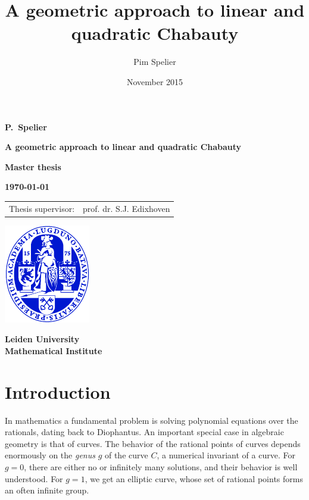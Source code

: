 \documentclass[12pt]{article}
\title{A geometric approach to linear and quadratic Chabauty}
\author{Pim Spelier}
\date{November 2015}
\theoremstyle{plain}
\theoremstyle{definition}
\theoremstyle{remark}
\begin{document}

\vspace*{1em}

\begin{center}

{\Large\bf 
P.\ Spelier
} 

\vspace{1em} 

{\LARGE\bf 
A geometric approach to linear and quadratic Chabauty
} 

\vspace{10em} 

{\large\bf 
Master thesis
} 

\vspace{1em}

{\large\bf 
\today
}

\vspace{10em} 

{\large\bf
\begin{tabular}{ll}
Thesis supervisor: & prof. dr. S.J. Edixhoven\\
\end{tabular}
}

\vfill

\includegraphics{ulzegel_blauw}\\

\vspace{2em}

{\large\bf 
Leiden University\\
Mathematical Institute\\
}

\end{center}
\thispagestyle{empty}
\newpage
\listoftodos
\tableofcontents
\newpage


\section{Introduction}
\label{section:intro}
In mathematics a fundamental problem is solving polynomial equations over the rationals, dating back to Diophantus. An important special case in algebraic geometry is that of curves. The behavior of the rational points of curves depends enormously on the \textit{genus} $g$ of the curve $C$, a numerical invariant of a curve. For $g = 0$, there are either no or infinitely many solutions, and their behavior is well understood. For $g = 1$, we get an elliptic curve, whose set of rational points forms an often infinite group.
\end{document}
